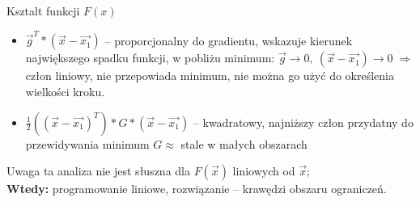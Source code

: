   \begin{frame}{Ksztalt funkcji $ F(x) $}
    \begin{itemize}
      \item[] $ \vec{g}^T * (\vec{x} - \vec{x_1}) $ -- proporcjonalny do
      gradientu, wskazuje kierunek największego spadku funkcji,
      w pobliżu minimum: $ \vec{g} \to 0{,}\ (\vec{x} - \vec{x_1}) \to 0
      \; \Rightarrow $ człon liniowy, nie przepowiada minimum,
      nie można go użyć do określenia wielkości kroku.
      \item[] $ \frac{1}{2}((\vec{x} - \vec{x_1})^T) * G * (\vec{x} - \vec{x_1}) $
      -- kwadratowy, najniższy człon przydatny do przewidywania minimum
      $ G \approx $ stale w małych obszarach
    \end{itemize}
    \begin{alertblock}{Uwaga}
      ta analiza nie jest słuszna dla $ F(\vec{x}) $ liniowych
      od $ \vec{x} $;\\
      \textbf{Wtedy:} programowanie liniowe, rozwiązanie --
      krawędzi obszaru ograniczeń.
    \end{alertblock}
  \end{frame}
